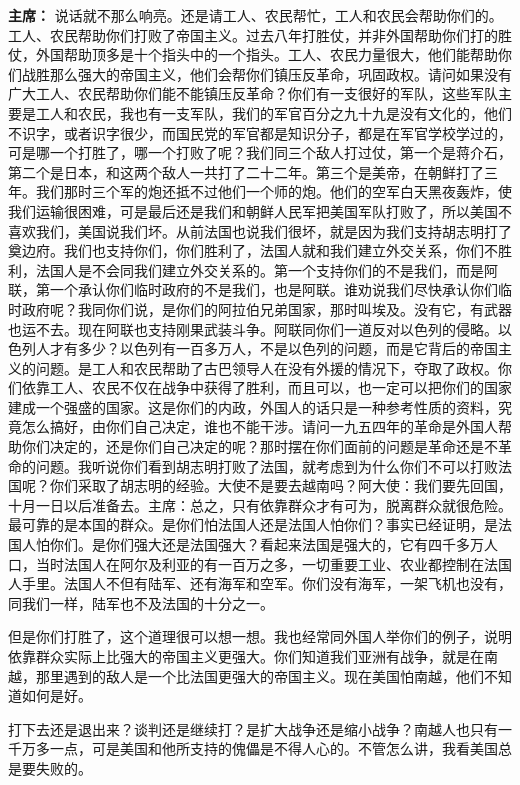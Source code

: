 \begin{list}{}
\item[\textbf{主席：}] 说话就不那么响亮。还是请工人、农民帮忙，工人和农民会帮助你们的。工人、农民帮助你们打败了帝国主义。过去八年打胜仗，并非外国帮助你们打的胜仗，外国帮助顶多是十个指头中的一个指头。工人、农民力量很大，他们能帮助你们战胜那么强大的帝国主义，他们会帮你们镇压反革命，巩固政权。请问如果没有广大工人、农民帮助你们能不能镇压反革命？你们有一支很好的军队，这些军队主要是工人和农民，我也有一支军队，我们的军官百分之九十九是没有文化的，他们不识字，或者识字很少，而国民党的军官都是知识分子，都是在军官学校学过的，可是哪一个打胜了，哪一个打败了呢？我们同三个敌人打过仗，第一个是蒋介石，第二个是日本，和这两个敌人一共打了二十二年。第三个是美帝，在朝鲜打了三年。我们那时三个军的炮还抵不过他们一个师的炮。他们的空军白天黑夜轰炸，使我们运输很困难，可是最后还是我们和朝鲜人民军把美国军队打败了，所以美国不喜欢我们，美国说我们坏。从前法国也说我们很坏，就是因为我们支持胡志明打了奠边府。我们也支持你们，你们胜利了，法国人就和我们建立外交关系，你们不胜利，法国人是不会同我们建立外交关系的。第一个支持你们的不是我们，而是阿联，第一个承认你们临时政府的不是我们，也是阿联。谁劝说我们尽快承认你们临时政府呢？我同你们说，是你们的阿拉伯兄弟国家，那时叫埃及。没有它，有武器也运不去。现在阿联也支持刚果武装斗争。阿联同你们一道反对以色列的侵略。以色列人才有多少？以色列有一百多万人，不是以色列的问题，而是它背后的帝国主义的问题。是工人和农民帮助了古巴领导人在没有外援的情况下，夺取了政权。你们依靠工人、农民不仅在战争中获得了胜利，而且可以，也一定可以把你们的国家建成一个强盛的国家。这是你们的内政，外国人的话只是一种参考性质的资料，究竟怎么搞好，由你们自己决定，谁也不能干涉。请问一九五四年的革命是外国人帮助你们决定的，还是你们自己决定的呢？那时摆在你们面前的问题是革命还是不革命的问题。我听说你们看到胡志明打败了法国，就考虑到为什么你们不可以打败法国呢？你们采取了胡志明的经验。大使不是要去越南吗？阿大使：我们要先回国，十月一日以后准备去。主席：总之，只有依靠群众才有可为，脱离群众就很危险。最可靠的是本国的群众。是你们怕法国人还是法国人怕你们？事实已经证明，是法国人怕你们。是你们强大还是法国强大？看起来法国是强大的，它有四千多万人口，当时法国人在阿尔及利亚的有一百万之多，一切重要工业、农业都控制在法国人手里。法国人不但有陆军、还有海军和空军。你们没有海军，一架飞机也没有，同我们一样，陆军也不及法国的十分之一。

但是你们打胜了，这个道理很可以想一想。我也经常同外国人举你们的例子，说明依靠群众实际上比强大的帝国主义更强大。你们知道我们亚洲有战争，就是在南越，那里遇到的敌人是一个比法国更强大的帝国主义。现在美国怕南越，他们不知道如何是好。

打下去还是退出来？谈判还是继续打？是扩大战争还是缩小战争？南越人也只有一千万多一点，可是美国和他所支持的傀儡是不得人心的。不管怎么讲，我看美国总是要失败的。


\end{list}
